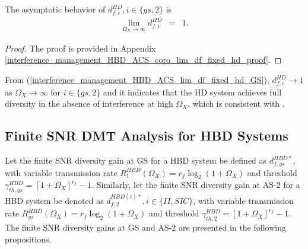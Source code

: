 \begin{corollary} \label{interference_management_HBD_ACS_coro_lim_df_fixed_hd}
The asymptotic behavior of $d_{f,i}^{HD}, i \in \{gs,2\}$ is
\begin{eqnarray}  \label{interference_management_HBD_ACS_lim_df_fixed_hd}
\lim_{\Omega_X \to \infty} d_{f,i}^{HD} & = & 1. 
\end{eqnarray}

\begin{proof}
The proof is provided in Appendix \ref{interference_management_HBD_ACS_coro_lim_df_fixed_hd_proof}.
\end{proof}
\end{corollary}

From (\ref{interference_management_HBD_ACS_lim_df_fixed_hd_GS}), $d_{f,i}^{HD} \to 1$ as $\Omega_X \to \infty$ for $i \in \{gs,2\}$ and it indicates that the HD system achieves full diversity in the absence of interference at high $\Omega_X$, which is consistent with \cite[Fig. 3]{shin2008diversity}.

\subsection{Finite SNR DMT Analysis for HBD Systems}

Let the finite SNR diversity gain at GS for a HBD system be defined as $d_{f,gs}^{HBD*}$, with variable transmission rate $R_1^{HBD}(\Omega_X)=r_f\log_2(1+\Omega_X)$ and threshold $\gamma_{th,gs}^{HBD} = [1+\Omega_X]^{r_f}-1$. Similarly, let the finite SNR diversity gain at AS-2 for a HBD system be denoted as $d_{f,2}^{HBD(i)*}, i \in \{II,SIC\}$, with variable transmission rate $R_{gs}^{HBD}(\Omega_X)=r_f\log_2(1+\Omega_X)$ and threshold $\gamma_{th,2}^{HBD} = [1+\Omega_X]^{r_f}-1$. The finite SNR diversity gains at GS and AS-2 are presented in the following propositions.

